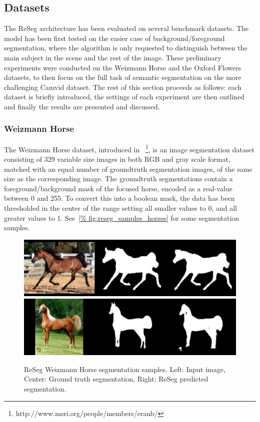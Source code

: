 \subsection{Datasets}

The ReSeg architecture has been evaluated on several benchmark datasets. The
model has been first tested on the easier case of background/foreground
segmentation, where the algorithm is only requested to distinguish between the
main subject in the scene and the rest of the image. These preliminary
experiments were conducted on the Weizmann Horse and the Oxford Flowers
datasets, to then focus on the full task of semantic segmentation on the more
challenging Camvid dataset. The rest of this section proceeds as follows: each
dataset is briefly introduced, the settings of each experiment are then
outlined and finally the results are presented and discussed.

\subsubsection{Weizmann Horse}
The Weizmann Horse dataset, introduced in~\citep{Borenstein04combiningtop-down}
\footnote{http://www.msri.org/people/members/eranb/},
is an image segmentation dataset consisting of 329 variable size images in both
RGB and gray scale format, matched with an equal number of groundtruth
segmentation images, of the same size as the corresponding image. The
groundtruth segmentations contain a foreground/background mask of the focused
horse, encoded as a real-value between 0 and 255. To convert this into a
boolean mask, the data has been thresholded in the center of the range setting
all smaller values to 0, and all greater values to 1. See~\autoref{%
fig:reseg_samples_horses} for some segmentation samples.

\begin{figure}[t!]
    \centering
    \includegraphics[width=\textwidth]{img/reseg/samples/horse1.pdf}\\
    \vspace{0.1em}
    \includegraphics[width=\textwidth]{img/reseg/samples/horse2.pdf}
    \caption{ReSeg Weizmann Horse segmentation samples.
        Left: Input image, Center: Ground truth segmentation,
        Right: ReSeg predicted segmentation.}
    \label{fig:reseg_samples_horses}
\end{figure}

